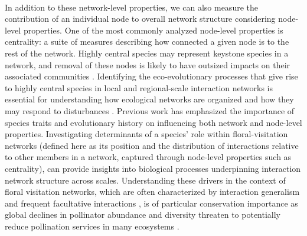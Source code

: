 \documentclass[12pt]{article}
\begin{document}
\paragraph*{}
In addition to these network-level properties, we can also measure the contribution of an individual node to overall network structure considering node-level properties. One of the most commonly analyzed node-level properties is centrality: a suite of measures describing how connected a given node is to the rest of the network. Highly central species may represent keystone species in a network, and removal of these nodes is likely to have outsized impacts on their associated communities \citep{traveset2017plant, maia2019plant, martins2024propagation}. Identifying the eco-evolutionary processes that give rise to highly central species in local and regional-scale interaction networks is essential for understanding how ecological networks are organized and how they may respond to disturbances \citep{moulatlet2023species, martins2025determinants, zhang2025network}. Previous work has emphasized the importance of species traits \citep{watts2016influence, lazaro2020linking, maia2019plant} and evolutionary history \citep{Gonzales2015macroecology, burin2021macroevolutionary} on influencing both network and node-level properties. Investigating determinants of a species' role within floral-visitation networks (defined here as its position and the distribution of interactions relative to other members in a network, captured through node-level properties such as centrality), can provide insights into biological processes underpinning interaction network structure across scales. Understanding these drivers in the context of floral visitation networks, which are often characterized by interaction generalism \citep{waser1996generalization,stanton2003interacting} and frequent facultative interactions \citep{geib2012tracing}, is of particular conservation importance as global declines in pollinator abundance and diversity threaten to potentially reduce pollination services in many ecosystems \citep{potts2010global, rodger2021widespread}. 


\end{document}
